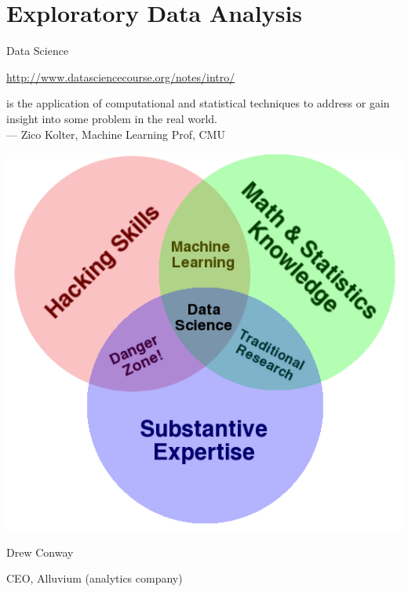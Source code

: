 \documentclass[aspectratio=169,usenames,dvipsnames]{beamer}
\begin{document}
\section{Exploratory Data Analysis}
\frame{\tableofcontents[currentsubsection]}

\begin{frame}{Data Science}
\begin{reference}
    \url{http://www.datasciencecourse.org/notes/intro/}
\end{reference}
    \begin{definition}
     is the application of
    computational and statistical techniques to
    address or gain %
    insight into some problem in the real world. \\
    --- Zico Kolter, Machine Learning Prof, CMU
    \end{definition}
\end{frame}


\begin{frame}
    \centering
    \includegraphics[height=0.8\textheight]{fig/venn}

    Drew Conway

    CEO, Alluvium (analytics company)
\end{frame}
\end{document}
